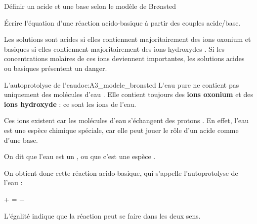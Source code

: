 \tetePremStssChim

\vspace*{-30pt}

\begin{objectifs}
  \item Définir un acide et une base selon le modèle de Br\o{}nsted
  \item Écrire l'équation d'une réaction acido-basique à partir des couples acide/base.
\end{objectifs}

\begin{contexte}
  Les solutions sont acides si elles contiennent majoritairement des ions oxonium \oxonium
  et basiques si elles contiennent majoritairement des ions hydroxydes \hydroxyde.
  Si les concentrations molaires de ces ions deviennent importantes, les solutions acides ou basiques présentent un danger.

\end{contexte}

\begin{doc}{L'autoprotolyse de l'eau}{doc:A3_modele_bronsted}
  L'eau pure ne contient pas uniquement des molécules d'eau .
  Elle contient toujours des \textbf{ions oxonium} \oxonium et des \textbf{ions hydroxyde} \hydroxyde : ce sont les ions de l'eau.

  Ces ions existent car les molécules d'eau  s'échangent des protons .
  En effet, l'eau est une espèce chimique spéciale, car elle peut jouer le rôle d'un acide comme d'une base.
  \begin{importants}  
    On dit que l'eau est un , ou que c'est une espèce .
  \end{importants}

  On obtient donc cette réaction acido-basique, qui s’appelle l’autoprotolyse de l’eau : 
  \begin{center}
     +  = \oxonium + \hydroxyde
  \end{center}
  \attention L'égalité indique que la réaction peut se faire dans les deux sens.
\end{doc}




